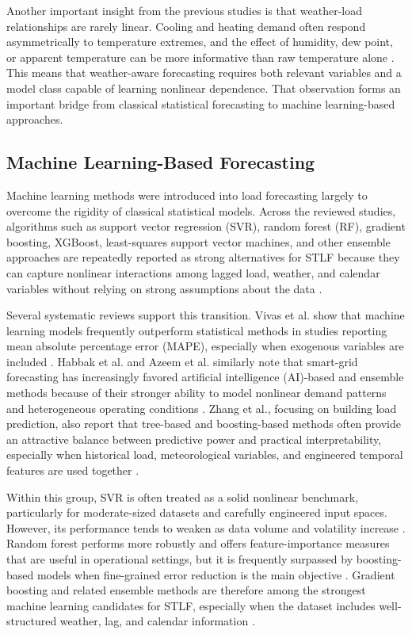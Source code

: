 \documentclass[conference]{IEEEtran}
\begin{document}
Another important insight from the previous studies is that weather-load relationships are rarely linear. Cooling and heating demand often respond asymmetrically to temperature extremes, and the effect of humidity, dew point, or apparent temperature can be more informative than raw temperature alone \cite{Mansouri,Chen}. This means that weather-aware forecasting requires both relevant variables and a model class capable of learning nonlinear dependence. That observation forms an important bridge from classical statistical forecasting to machine learning-based approaches.

\subsection{Machine Learning-Based Forecasting}
Machine learning methods were introduced into load forecasting largely to overcome the rigidity of classical statistical models. Across the reviewed studies, algorithms such as support vector regression (SVR), random forest (RF), gradient boosting, XGBoost, least-squares support vector machines, and other ensemble approaches are repeatedly reported as strong alternatives for STLF because they can capture nonlinear interactions among lagged load, weather, and calendar variables without relying on strong assumptions about the data \cite{vivas2020,azeem2021,habbak2023,zhang2021,wazirali2023}. 

Several systematic reviews support this transition. Vivas et al. show that machine learning models frequently outperform statistical methods in studies reporting mean absolute percentage error (MAPE), especially when exogenous variables are included \cite{vivas2020}. Habbak et al. and Azeem et al. similarly note that smart-grid forecasting has increasingly favored artificial intelligence (AI)-based and ensemble methods because of their stronger ability to model nonlinear demand patterns and heterogeneous operating conditions \cite{habbak2023,azeem2021}. Zhang et al., focusing on building load prediction, also report that tree-based and boosting-based methods often provide an attractive balance between predictive power and practical interpretability, especially when historical load, meteorological variables, and engineered temporal features are used together \cite{zhang2021}. 

Within this group, SVR is often treated as a solid nonlinear benchmark, particularly for moderate-sized datasets and carefully engineered input spaces. However, its performance tends to weaken as data volume and volatility increase \cite{khalil2022,zhang2021}. Random forest performs more robustly and offers feature-importance measures that are useful in operational settings, but it is frequently surpassed by boosting-based models when fine-grained error reduction is the main objective \cite{zhang2021,habbak2023}. Gradient boosting and related ensemble methods are therefore among the strongest machine learning candidates for STLF, especially when the dataset includes well-structured weather, lag, and calendar information \cite{azeem2021,habbak2023}. 
\end{document}

